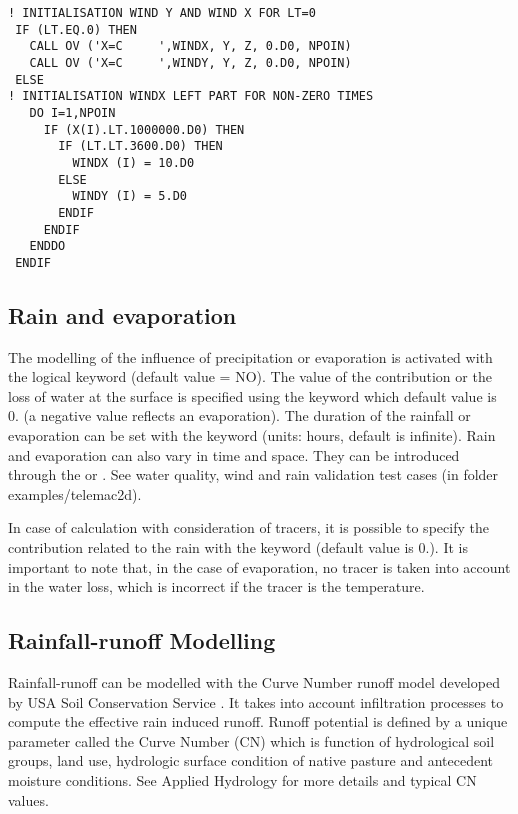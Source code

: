 \begin{lstlisting}[language=TelFortran]
! INITIALISATION WIND Y AND WIND X FOR LT=0
 IF (LT.EQ.0) THEN
   CALL OV ('X=C     ',WINDX, Y, Z, 0.D0, NPOIN)
   CALL OV ('X=C     ',WINDY, Y, Z, 0.D0, NPOIN)
 ELSE
! INITIALISATION WINDX LEFT PART FOR NON-ZERO TIMES
   DO I=1,NPOIN
     IF (X(I).LT.1000000.D0) THEN
       IF (LT.LT.3600.D0) THEN
         WINDX (I) = 10.D0
       ELSE
         WINDY (I) = 5.D0
       ENDIF
     ENDIF
   ENDDO
 ENDIF
\end{lstlisting}

\subsection{Rain and evaporation}

The modelling of the influence of precipitation or evaporation is activated
with the logical keyword  (default value = NO).
The value of the contribution or the loss of water at the surface is specified
using the keyword  which default value
is 0. (a negative value reflects an evaporation).
The duration of the rainfall or evaporation can be set with the keyword
 (units: hours, default is
infinite).
Rain and evaporation can also vary in time and space.
They can be introduced through the 
or .
See water quality, wind and rain validation test cases (in folder
examples/telemac2d).

In case of calculation with consideration of tracers, it is possible to specify
the contribution related to the rain with the keyword
 (default value is 0.).
It is important to note that, in the case of evaporation, no tracer is taken
into account in the water loss, which is incorrect if the tracer is the
temperature.

\subsection{Rainfall-runoff Modelling}

Rainfall-runoff can be modelled with the Curve Number runoff model developed
by USA Soil Conservation Service \cite{soil1972national}. It takes into 
account infiltration processes to compute the effective rain induced runoff.
Runoff potential is defined by a unique parameter called the Curve Number (CN)
which is function of hydrological soil groups, land use, hydrologic surface
condition of native pasture and antecedent moisture conditions.
See Applied Hydrology \citep{chow1988mays} 
for more details and typical CN values. 


